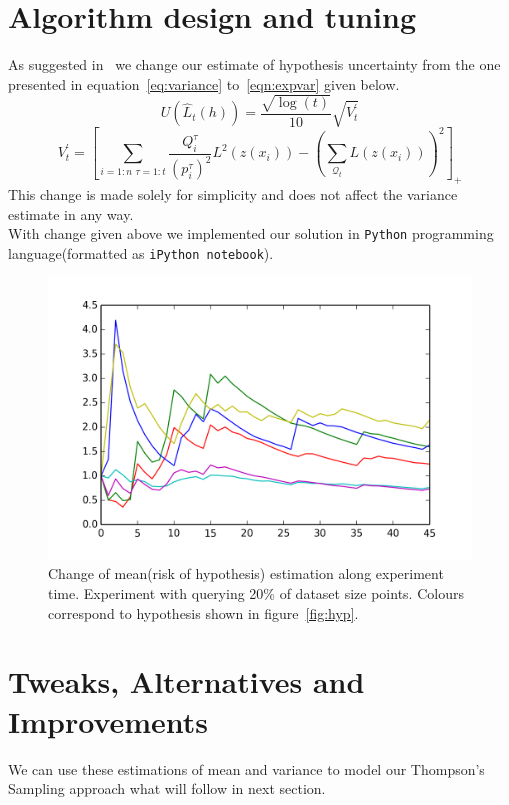 \documentclass[12pt, a4paper, pdflatex, leqno]{report}
\begin{document}
\section{Algorithm design and tuning}
As suggested in~\citep{DBLP:journals/corr/GantiG13} we change our estimate of hypothesis uncertainty from the one presented in equation~\ref{eq:variance} to~\ref{eqn:expvar} given below.\\
\begin{equation}
\label{eqn:expvar}
U(\hat{L}_t(h)) = \frac{ \sqrt{ \log(t) } }
                       { 10 }
                  \sqrt{ V^\prime_t }
\end{equation}
$$
V^\prime_t = \left[
  \sum_{i = 1:n \text{~} \tau = 1:t} \frac{Q^\tau_i}{(p^\tau_i)^2} L^2(z(x_i))
  -
  \left( \sum_{\mathscr{Q}_t} L(z(x_i)) \right)^2
\right]_+
$$
This change is made solely for simplicity and does not affect the variance estimate in any way.\\

With change given above we implemented our solution in \texttt{Python} programming language(formatted as \texttt{iPython notebook}). 




\begin{figure}[htbp]
  \centering
  \includegraphics[width=0.7\linewidth]{graphics/convergence.png}
  \begin{tiny}
    \caption{Change of mean(risk of hypothesis) estimation along experiment time. Experiment with querying 20\% of dataset size points. Colours correspond to hypothesis shown in figure~\ref{fig:hyp}.\label{fig:conv}}
  \end{tiny}
  \vspace{1cm}
\end{figure}


\section{Tweaks, Alternatives and Improvements\label{sec:qimprove}}
We can use these estimations of mean and variance to model our Thompson's Sampling approach what will follow in next section.\\
\end{document}
